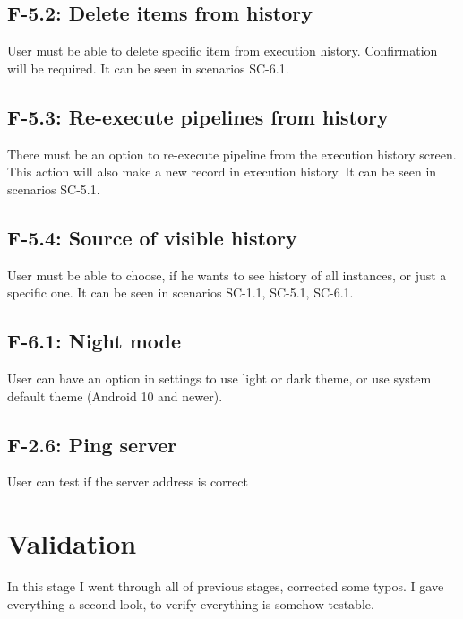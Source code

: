 \subsection*{F-5.2: Delete items from history}
User must be able to delete specific item from execution history. Confirmation will be required. It can be seen in scenarios SC-6.1.
\subsection*{F-5.3: Re-execute pipelines from history}
There must be an option to re-execute pipeline from the execution history screen. This action will also make a new record in execution history. It can be seen in scenarios SC-5.1.
\subsection*{F-5.4: Source of visible history}
User must be able to choose, if he wants to see history of all instances, or just a specific one. It can be seen in scenarios SC-1.1, SC-5.1, SC-6.1.
\subsection*{F-6.1: Night mode}
User can have an option in settings to use light or dark theme, or use system default theme (Android 10 and newer).
\subsection*{F-2.6: Ping server}
User can test if the server address is correct

\section{Validation}
In this stage I went through all of previous stages, corrected some typos. I gave everything a second look, to verify everything is somehow testable.